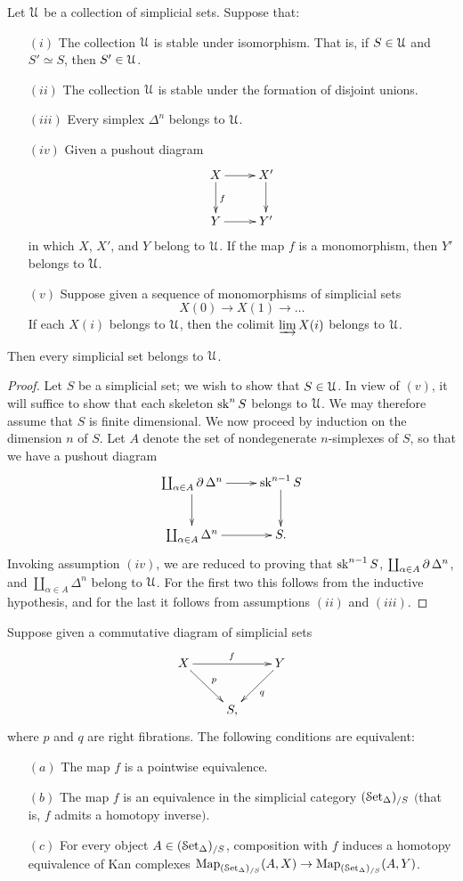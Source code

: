 \begin{lemma}\label{blem}
Let $\operatorname{\mathcal{U}}$ be a collection of simplicial sets. Suppose that:
\begin{itemize}
\item[$(i)$] The collection $\operatorname{\mathcal{U}}$ is stable under isomorphism. That is, if
$S \in \operatorname{\mathcal{U}}$ and $S' \simeq S$, then $S' \in \operatorname{\mathcal{U}}$.
\item[$(ii)$] The collection $\operatorname{\mathcal{U}}$ is stable under the formation of disjoint unions.
\item[$(iii)$] Every simplex $\Delta^n$ belongs to $\operatorname{\mathcal{U}}$.
\item[$(iv)$] Given a pushout diagram
$$ \xymatrix{ X \ar[r] \ar[d]^{f} & X' \ar[d] \\
Y \ar[r] & Y' }$$
in which $X$, $X'$, and $Y$ belong to $\operatorname{\mathcal{U}}$. If the map $f$ is a monomorphism, then
$Y'$ belongs to $\operatorname{\mathcal{U}}$.
\item[$(v)$] Suppose given a sequence of monomorphisms of simplicial sets
$$ X(0) \rightarrow X(1) \rightarrow \ldots $$
If each $X(i)$ belongs to $\operatorname{\mathcal{U}}$, then the colimit $\operatorname{\varinjlim} X(i)$ belongs to $\operatorname{\mathcal{U}}$.
\end{itemize}
Then every simplicial set belongs to $\operatorname{\mathcal{U}}$.
\end{lemma}

\begin{proof}
Let $S$ be a simplicial set; we wish to show that $S \in \operatorname{\mathcal{U}}$. In view of $(v)$, it will suffice
to show that each skeleton $\operatorname{sk}^{n} S$ belongs to $\operatorname{\mathcal{U}}$. We may therefore assume that
$S$ is finite dimensional. We now proceed by induction on the dimension $n$ of $S$.
Let $A$ denote the set of nondegenerate $n$-simplexes of $S$, so that we have a pushout
diagram
$$ \xymatrix{ \coprod_{\alpha \in A} \bd \Delta^n \ar[r] \ar[d] & \sk^{n-1} S \ar[d] \\
\coprod_{\alpha \in A} \Delta^n \ar[r] & S. }$$
Invoking assumption $(iv)$, we are reduced to proving that
$\operatorname{sk}^{n-1} S$, $\coprod_{ \alpha \in A} \operatorname{\partial} \Delta^n$, and $\coprod_{\alpha \in A} \Delta^n$
belong to $\operatorname{\mathcal{U}}$. For the first two this follows from the inductive hypothesis, and for the
last it follows from assumptions $(ii)$ and $(iii)$.
\end{proof}

\begin{lemma}\label{postcuse}
Suppose given a commutative diagram of simplicial sets
$$ \xymatrix{ X \ar[rr]^{f} \ar[dr]^{p} & & Y \ar[dl]^{q} \\
& S, & }$$
where $p$ and $q$ are right fibrations. The following conditions are equivalent:
\begin{itemize}
\item[$(a)$] The map $f$ is a pointwise equivalence.
\item[$(b)$] The map $f$ is an equivalence in the simplicial category $( \operatorname{\mathcal{S}et_{\Delta}})_{/S}$
$($that is, $f$ admits a homotopy inverse{}$)$.
\item[$(c)$] For every object $A \in (\operatorname{\mathcal{S}et_{\Delta}})_{/S}$, composition with $f$ induces a homotopy
equivalence of Kan complexes $\operatorname{{Map}}_{ (\operatorname{\mathcal{S}et_{\Delta}})_{/S}}( A, X) \rightarrow
\operatorname{{Map}}_{ (\operatorname{\mathcal{S}et_{\Delta}})_{/S}}(A, Y)$.
\end{itemize}
\end{lemma}

